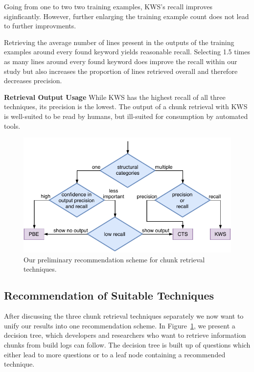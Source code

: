 Going from one to two two training examples, KWS's recall improves
siginficantly. However, further enlarging the training example count
does not lead to further improvments.

Retrieving the average number of lines present in the outputs of the training examples around every found keyword yields reasonable recall.
Selecting 1.5 times as many lines around every found keyword does improve the recall within our study but also increases the proportion of lines retrieved overall and therefore decreases precision.

\noindent
\textbf{Retrieval Output Usage}
While KWS has the highest recall of all three techniques, its precision is the lowest.
The output of a chunk retrieval with KWS is well-suited to be read by humans, but ill-suited for consumption by automated tools.

\begin{figure}[tb]
		\centering
		\includegraphics[width=\columnwidth, clip]{img/crt-recommendation.pdf}
		\caption{Our preliminary recommendation scheme for chunk retrieval techniques.}
		\label{fig:crt-recommendation}
\end{figure}

\subsection{Recommendation of Suitable Techniques}
After discussing the three chunk retrieval techniques separately we now want to unify our results into one recommendation scheme.
In Figure~\ref{fig:crt-recommendation}, we present a decision tree, which developers and researchers who want to retrieve information chunks from build logs can follow.
The decision tree is built up of questions which either lead to more questions or to a leaf node containing a recommended technique. 

